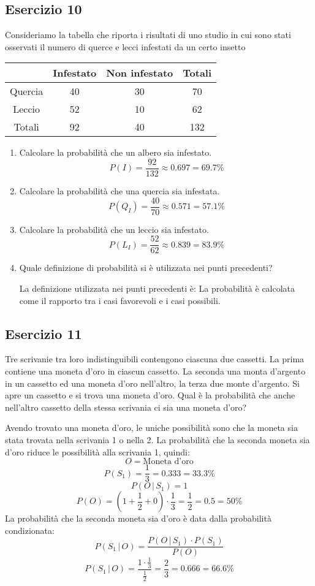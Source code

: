 \documentclass[a4paper]{article}
\theoremstyle{break}
\theoremstyle{break}
\theoremstyle{break}
\theoremstyle{break}
\begin{document}
\subsection{Esercizio 10}
Consideriamo la tabella che riporta i risultati di uno studio in cui sono stati osservati il numero di
querce e lecci infestati da un certo insetto
\begin{table}[H]
	\centering
	\begin{tabular}{c|ccc}
		        & Infestato & Non infestato & Totali \\
		\hline
		Quercia & 40        & 30            & 70     \\
		Leccio  & 52        & 10            & 62     \\
		\hline
		Totali  & 92        & 40            & 132
	\end{tabular}
\end{table}
\begin{enumerate}
	\item Calcolare la probabilità che un albero sia infestato.
	      \[
		      P(I) = \frac{92}{132} \approx 0.697 = 69.7\%
	      \]
	\item Calcolare la probabilità che una quercia sia infestata.
	      \[
		      P(Q_I) = \frac{40}{70} \approx 0.571 = 57.1\%
	      \]
	\item Calcolare la probabilità che un leccio sia infestato.
	      \[
		      P(L_I) = \frac{52}{62} \approx 0.839 = 83.9\%
	      \]
	\item Quale definizione di probabilità si è utilizzata nei punti precedenti?

	      \vspace{1em}
	      La definizione utilizzata nei punti precedenti è: La probabilità è calcolata come
	      il rapporto tra i casi favorevoli e i casi possibili.
\end{enumerate}

\subsection{Esercizio 11}
Tre scrivanie tra loro indistinguibili contengono ciascuna due cassetti. La prima
contiene una moneta d'oro in ciascun cassetto. La seconda una monta d'argento in un
cassetto ed una moneta d'oro nell'altro, la terza due monte d'argento. Si apre un
cassetto e si trova una moneta d'oro. Qual è la probabilità che anche nell'altro cassetto
della stessa scrivania ci sia una moneta d'oro?

\vspace{1em}
\noindent Avendo trovato una moneta d'oro, le uniche possibilità sono che la moneta sia stata
trovata nella scrivania 1 o nella 2. La probabilità che la seconda moneta sia d'oro riduce
le possibilità alla scrivania 1, quindi:
\[
	O = \text{Moneta d'oro}
\]
\[
	P(S_1) = \frac{1}{3} = 0.333 = 33.3\%
\]
\[
	P(O\,|\,S_1) = 1
\]
\[
	P(O) = \left( 1 + \frac{1}{2} + 0 \right) \cdot \frac{1}{3} = \frac{1}{2} = 0.5 = 50\%
\]
La probabilità che la seconda moneta sia d'oro è data dalla probabilità condizionata:
\[
	P(S_1\,|\,O) = \frac{P(O\,|\,S_1) \cdot P(S_1)}{P(O)}
\]
\[
	P(S_1\,|\,O) = \frac{1 \cdot \frac{1}{3}}{\frac{1}{2}} = \frac{2}{3} = 0.666 = 66.6\%
\]
\end{document}
